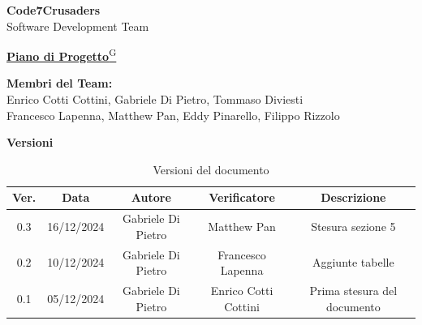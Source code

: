 \documentclass{article}
\begin{document}
\begin{titlepage}
    {\Huge \textbf{Code7Crusaders}}\\
    \vspace{0.5cm}
    {\Large Software Development Team}\\
    \vspace{2cm}
    
    {\large \href{https://code7crusaders.github.io/docs/RTB/documentazione_interna/glossario.html#piano-di-progetto}{\textbf{Piano di Progetto}\textsuperscript{G}}}\\
    \vspace{5cm}
    
    
    \textbf{Membri del Team:}\\
    Enrico Cotti Cottini, Gabriele Di Pietro, Tommaso Diviesti \\
    Francesco Lapenna, Matthew Pan, Eddy Pinarello, Filippo Rizzolo \\
    \vspace{0.5cm}
    
    \vspace{1cm}
\end{titlepage}



\begin{table}[h!]
\centering
\textbf{Versioni} \\ %
\vspace{2mm} %
\begin{tabular}{|c|c|c|c|c|}
    \hline
    \textbf{Ver.} & \textbf{Data} & \textbf{Autore} & \textbf{Verificatore} & \textbf{Descrizione} \\
    \hline
    0.3 & 16/12/2024 & Gabriele Di Pietro & Matthew Pan & Stesura sezione 5 \\
    0.2 & 10/12/2024 & Gabriele Di Pietro & Francesco Lapenna & Aggiunte tabelle \\
    0.1 & 05/12/2024 & Gabriele Di Pietro & Enrico Cotti Cottini & Prima stesura del documento \\  
    \hline
\end{tabular}
\caption{Versioni del documento}
\label{tab:versioni}
\end{table}
\end{document}
